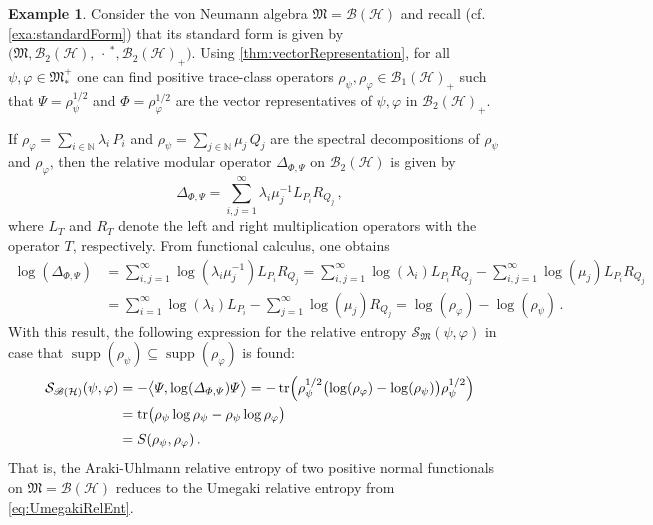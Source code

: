 \documentclass[a4paper, twoside, 11pt, reqno]{amsart}
\theoremstyle{definition}
\newtheorem{example}[definition]{Example}
\theoremstyle{plain}
\renewcommand{\subset}{\subseteq}
\renewcommand{\Delta}{\varDelta}
\renewcommand{\Phi}{\varPhi}
\renewcommand{\Psi}{\varPsi}
\newcommand{\N}{\mathbb{N}}
\newcommand{\MH}{\mathcal{H}}
\newcommand{\MS}{\mathcal{S}}
\newcommand{\MFM}{\mathfrak{M}}
\newcommand{\BO}{\mathscr{B}}
\newcommand{\NO}{\BO_1}
\newcommand{\HS}{\BO_2}
\newcommand{\NF}[1]{#1_{\ast}^{+}}
\newcommand{\1}{\mathbf{1}}
\DeclareMathOperator{\supp}{supp}
\DeclareMathOperator{\tr}{tr}
\newcommand{\braket}[2][]{#1\langle{#2}#1\rangle}
\newcommand{\inv}[1]{#1^{-1}}
\begin{document}
\begin{example}\label{exa:relativeEntropy}
    Consider the von Neumann algebra $\MFM = \BO(\MH)$ and recall (cf. \cref{exa:standardForm}) that its standard form is given by $\bigl(\MFM, \HS(\MH), \,\cdot\,^\ast, \HS(\MH)_+\bigr)$. Using \cref{thm:vectorRepresentation}, for all $\psi, \varphi \in \NF{\MFM}$ one can find positive trace-class operators $\rho_\psi, \rho_\varphi \in \NO(\MH)_+$ such that $\Psi = \rho_{\psi}^{1/2}$ and $\Phi = \rho_\varphi^{1/2}$ are the vector representatives of $\psi, \varphi$ in $\HS(\MH)_+$.
        
    If $\rho_\varphi = \sum_{i \in \N} \lambda_i \, P_i$ and $\rho_\psi = \sum_{j \in \N} \mu_j \, Q_j$ are the spectral decompositions of $\rho_\psi$ and $\rho_\varphi$, then the relative modular operator $\Delta_{\Phi, \Psi}$ on $\HS(\MH)$ is given by \cite[Exa. 10.4 (2)]{Hiai2021}
    \begin{equation*}
        \Delta_{\Phi, \Psi} = \sum_{i,j=1}^{\infty} \lambda_i \inv{\mu_j} L_{P_i} R_{Q_j} \, ,
    \end{equation*}
    where $L_T$ and $R_T$ denote the left and right multiplication operators with the operator $T$, respectively. From functional calculus, one obtains
    \begin{align*}
        \log(\Delta_{\Phi, \Psi}) &= \sum_{i,j=1}^{\infty} \log(\lambda_i \inv{\mu_j}) L_{P_i} R_{Q_j} = \sum_{i,j=1}^{\infty} \log(\lambda_i) L_{P_i} R_{Q_j} - \sum_{i,j=1}^{\infty} \log(\mu_j) L_{P_i} R_{Q_j} \\
        &= \sum_{i=1}^{\infty} \log(\lambda_i) L_{P_i} - \sum_{j=1}^{\infty} \log(\mu_j) R_{Q_j} = \log(\rho_\varphi) - \log(\rho_\psi) \, .
    \end{align*}
    With this result, the following expression for the relative entropy $\MS_\MFM(\psi, \varphi)$ in case that $\supp(\rho_\psi) \subset \supp(\rho_\varphi)$ is found:
    \begin{align*}
        \MS_{\BO(\MH)}(\psi, \varphi) &= - \braket[\big]{\Psi, \log(\Delta_{\Phi, \Psi}) \Psi} = - \tr \Bigl(\rho_\psi^{1/2} \bigl(\log(\rho_\varphi) - \log(\rho_\psi)\bigr) \rho_\psi^{1/2}\Bigr) \\
        &= \tr\bigl(\rho_\psi \log \rho_\psi - \rho_\psi \log \rho_\varphi\bigr) \\[3pt]
        &= S(\rho_\psi, \rho_\varphi) \, .
    \end{align*}
    That is, the Araki-Uhlmann relative entropy of two positive normal functionals on $\MFM = \BO(\MH)$ reduces to the Umegaki relative entropy from \cref{eq:UmegakiRelEnt}.
\end{example}
\end{document}
